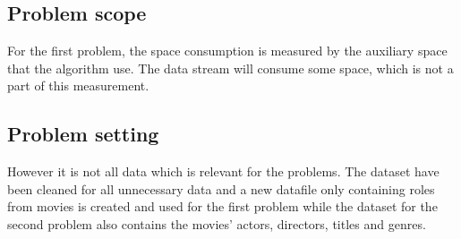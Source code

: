 \subsection{Problem scope}
For the first problem, the space consumption is measured by the auxiliary space that the algorithm use. The data stream will consume some space, which is not a part of this measurement.

\subsection{Problem setting}
However it is not all data which is relevant for the problems. The dataset have been cleaned for all unnecessary data and a new datafile only containing roles from movies is created and used for the first problem while the dataset for the second problem also contains the movies' actors, directors, titles and genres.
